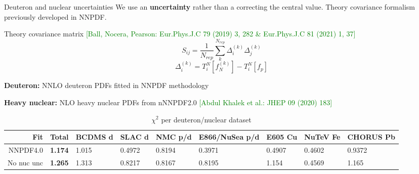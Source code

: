 \author[Rosalyn Pearson]{}


\begin{frame}[fragile]{Deuteron and nuclear uncertainties}
We use an {\bf uncertainty} rather than a correcting the central value.
\newline
Theory covariance formalism previously developed in NNPDF.
      \begin{block}{Theory covariance matrix \tiny{ \textcolor{green}{[Ball, Nocera, Pearson: Eur.Phys.J.C 79 (2019) 3, 282 \& Eur.Phys.J.C 81 (2021) 1, 37]}}}
        \begin{equation}
            S_{ij} = \frac{1}{N_{rep}} \sum_k^{N_{rep}} \Delta_i^{(k)}\Delta_j^{(k)}
        \end{equation}
        \begin{equation}
            \Delta_i^{(k)} = T_i^{N}[f_{N}^{(k)}] - T_i^{N}[f_{p}]
        \end{equation}
      \end{block}
      
    \textbf{Deuteron:} NNLO deuteron PDFs fitted in NNPDF methodology 
    
    \textbf{Heavy nuclear:} NLO heavy nuclear PDFs from nNNPDF2.0 \tiny{ \textcolor{green}{[Abdul Khalek et al.: JHEP 09 (2020) 183]}}
  \begin{table}
    \caption{$\chi^2$ per deuteron/nuclear dataset}
    \begin{tabular}{rllllllll}
      \toprule
      Fit & {\bf Total} & BCDMS d & SLAC d & NMC p/d & E866/NuSea p/d & E605 Cu & NuTeV Fe & CHORUS Pb \\
      \midrule
      NNPDF4.0 & {\bf 1.174} & 1.015 & 0.4972 & 0.8194 & 0.3971 & 0.4907 & 0.4602 & 0.9372 \\
      No nuc unc & {\bf 1.265} & 1.313 & 0.8217 & 0.8167 & 0.8195 & 1.154 & 0.4569 & 1.165 \\
      \bottomrule
    \end{tabular}
  \end{table}
\end{frame}

